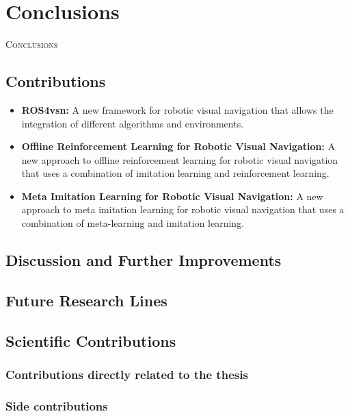 \chapter{Conclusions}\label{ch:conclusions}

\lettrine{C}{onclusions}


\section{Contributions}\label{sec:contributions}
\begin{itemize}
    \item \textbf{ROS4\acrshort{vsn}:} A new framework for robotic visual navigation that allows the integration of different algorithms and environments.
    \item \textbf{Offline Reinforcement Learning for Robotic Visual Navigation:} A new approach to offline reinforcement learning for robotic visual navigation that uses a combination of imitation learning and reinforcement learning.
    \item \textbf{Meta Imitation Learning for Robotic Visual Navigation:} A new approach to meta imitation learning for robotic visual navigation that uses a combination of meta-learning and imitation learning.
\end{itemize}


\section{Discussion and Further Improvements}\label{sec:discussion-and-further-improvements}


\section{Future Research Lines}\label{sec:future-work}


\section{Scientific Contributions}\label{sec:final-remarks}

\subsection{Contributions directly related to the thesis}\label{subsec:contributions-directly-related-to-the-thesis}

\subsection{Side contributions}\label{subsec:side-contributions}
